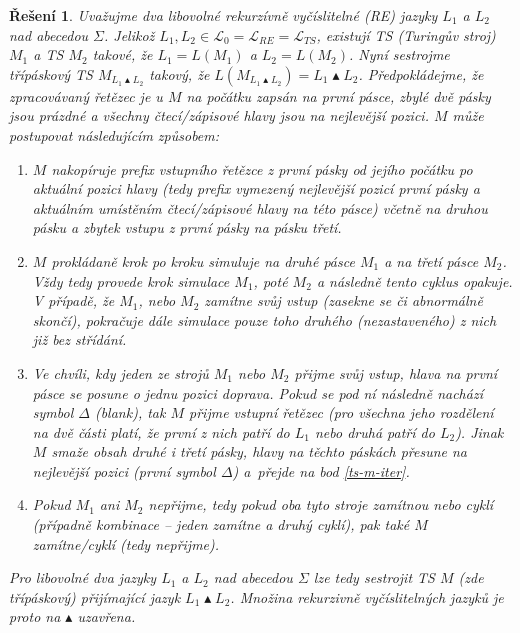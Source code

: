 \documentclass[11pt, a4paper]{article}
\theoremstyle{result}
\newtheorem*{result}{Řešení}
\begin{document}
\begin{enumerate}
    
    \begin{result}
        Uvažujme dva libovolné rekurzívně vyčíslitelné (RE) jazyky $L_1$ a $L_2$ nad abecedou $\Sigma$. Jelikož $L_1, L_2 \in \mathcal{L}_0 = \mathcal{L}_{RE} = \mathcal{L}_{TS}$, existují TS (Turingův stroj) $M_1$ a TS $M_2$ takové, že $L_1 = L(M_1)$ a $L_2 = L(M_2)$. Nyní sestrojme třípáskový TS $M_{L_1 \blacktriangle L_2}$ takový, že $L(M_{L_1 \blacktriangle L_2}) = L_1 \blacktriangle L_2$. Předpokládejme, že zpracovávaný řetězec je u $M$ na počátku zapsán na první pásce, zbylé dvě pásky jsou prázdné a všechny čtecí/zápisové hlavy jsou na nejlevější pozici. $M$ může postupovat následujícím způsobem:
        \begin{enumerate}[(1)]
            \item $M$ nakopíruje prefix vstupního řetězce z první pásky od jejího počátku po aktuální pozici hlavy (tedy prefix vymezený nejlevější pozicí první pásky a aktuálním umístěním čtecí/zápisové hlavy na této pásce) včetně na druhou pásku a zbytek vstupu z první pásky na pásku třetí. \label{ts-m-iter}
            
            \item $M$ prokládaně krok po kroku simuluje na druhé pásce $M_1$ a na třetí pásce $M_2$. Vždy tedy provede krok simulace $M_1$, poté $M_2$ a následně tento cyklus opakuje. V případě, že $M_1$, nebo $M_2$ zamítne svůj vstup (zasekne se či abnormálně skončí), pokračuje dále simulace pouze toho druhého (nezastaveného) z nich již bez střídání.
           
            \item Ve chvíli, kdy jeden ze strojů $M_1$ nebo $M_2$ přijme svůj vstup, hlava na první pásce se posune o jednu pozici doprava. Pokud se pod ní následně nachází symbol $\Delta$ (blank), tak $M$ přijme vstupní řetězec (pro všechna jeho rozdělení na dvě části platí, že první z nich patří do $L_1$ nebo druhá patří do $L_2$). Jinak $M$ smaže obsah druhé i třetí pásky, hlavy na těchto páskách přesune na nejlevější pozici (první symbol $\Delta$) a~přejde na bod \ref{ts-m-iter}.
            
            \item Pokud $M_1$ ani $M_2$ nepřijme, tedy pokud oba tyto stroje zamítnou nebo cyklí (případně kombinace -- jeden zamítne a druhý cyklí), pak také $M$ zamítne/cyklí (tedy nepřijme).
        \end{enumerate}
    
        Pro libovolné dva jazyky $L_1$ a $L_2$ nad abecedou $\Sigma$ lze tedy sestrojit TS $M$ (zde třípáskový) přijímající jazyk $L_1 \blacktriangle L_2$. Množina rekurzivně vyčíslitelných jazyků je proto na $\blacktriangle$ uzavřena.
    \end{result}
    
    
    
    
    
\end{enumerate}
\end{document}
